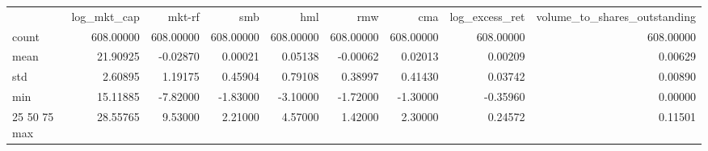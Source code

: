 \begin{tabular}{lrrrrrrrr}
 & log_mkt_cap & mkt-rf & smb & hml & rmw & cma & log_excess_ret & volume_to_shares_outstanding \\
count & 608.00000 & 608.00000 & 608.00000 & 608.00000 & 608.00000 & 608.00000 & 608.00000 & 608.00000 \\
mean & 21.90925 & -0.02870 & 0.00021 & 0.05138 & -0.00062 & 0.02013 & 0.00209 & 0.00629 \\
std & 2.60895 & 1.19175 & 0.45904 & 0.79108 & 0.38997 & 0.41430 & 0.03742 & 0.00890 \\
min & 15.11885 & -7.82000 & -1.83000 & -3.10000 & -1.72000 & -1.30000 & -0.35960 & 0.00000 \\
25%
50%
75%
max & 28.55765 & 9.53000 & 2.21000 & 4.57000 & 1.42000 & 2.30000 & 0.24572 & 0.11501 \\
\end{tabular}
